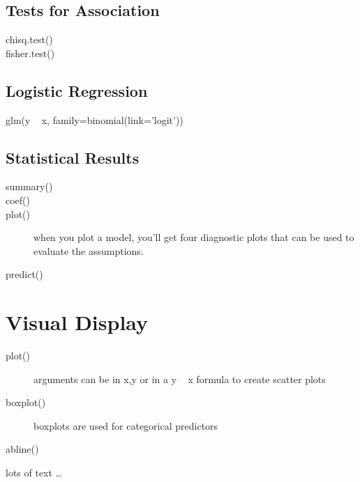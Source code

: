 \documentclass{article}
\begin{document}
\begin{multicols}{3}
\subsection*{Tests for Association}

\begin{description}
\item[chisq.test()]
\item[fisher.test()]
\end{description}

\subsection*{Logistic Regression}

\begin{description}
\item[glm(y ~ x, family=binomial(link='logit'))]
\end{description}

\subsection*{Statistical Results}
\begin{description}
\item[summary()]
\item[coef()]
\item[plot()] when you plot a model, you'll get four diagnostic plots that can be used to evaluate the assumptions.
\item[predict()]
\end{description}

\section*{Visual Display}

\begin{description}
\item[plot()] arguments can be in x,y or in a y ~ x formula to create scatter plots
\item[boxplot()] boxplots are used for categorical predictors
\item[abline()]
\item[]

\end{description}

  lots of text
  \ldots
\end{multicols}
\end{document}
